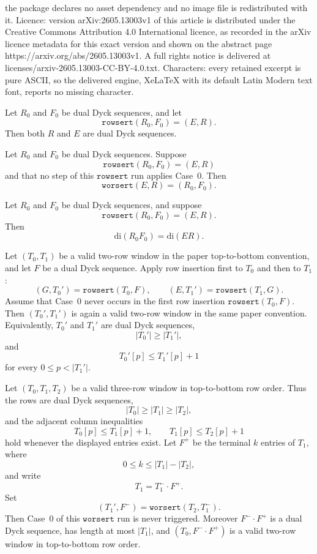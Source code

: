 \documentclass[10pt,a4paper]{amsart}
\newcommand{\di}{\mathrm{di}}
\newcommand{\rowsert}{\texttt{rowsert}}
\newcommand{\worsert}{\texttt{worsert}}
\begin{document}
the package declares no asset dependency and no image file is redistributed with it. Licence: version arXiv:2605.13003v1 of this article is distributed under the Creative Commons Attribution 4.0 International licence, as recorded in the arXiv licence metadata for this exact version and shown on the abstract page https://arxiv.org/abs/2605.13003v1. A full rights notice is delivered at licenses/arxiv-2605.13003-CC-BY-4.0.txt. Characters: every retained excerpt is pure ASCII, so the delivered engine, XeLaTeX with its default Latin Modern text font, reports no missing character.
\begin{lemma}
\label{lem:rowsert-dual-dyck}
Let \(R_0\) and \(F_0\) be dual Dyck sequences, and let
\[
  \rowsert(R_0,F_0)=(E,R).
\]
Then both \(R\) and \(E\) are dual Dyck sequences.
\end{lemma}

\begin{theorem}
\label{thm:rowsert-global-reversibility}
Let \(R_0\) and \(F_0\) be dual Dyck sequences.  Suppose
\[
  \rowsert(R_0,F_0)=(E,R)
\]
and that no step of this \(\rowsert\) run applies Case~0.  Then
\[
  \worsert(E,R)=(R_0,F_0).
\]
\end{theorem}

\begin{lemma}[\(\di\)-preservation for row insertion]
\label{lem:rowsert-di-preservation}
Let \(R_0\) and \(F_0\) be dual Dyck sequences, and suppose
\[
  \rowsert(R_0,F_0)=(E,R).
\]
Then
\[
  \di(R_0F_0)=\di(ER).
\]
\end{lemma}

\begin{lemma}
\label{lem:two-row-tableau-insertion}
Let \((T_0,T_1)\) be a valid two-row window in the paper top-to-bottom
convention, and let \(F\) be a dual Dyck sequence.  Apply row insertion first to
\(T_0\) and then to \(T_1\):
\[
  (G,T_0')=\rowsert(T_0,F),
  \qquad
  (E,T_1')=\rowsert(T_1,G).
\]
Assume that Case~0 never occurs in the first row insertion \(\rowsert(T_0,F)\).
Then \((T_0',T_1')\) is again a valid two-row window in the same paper
convention.  Equivalently, \(T_0'\) and \(T_1'\) are dual Dyck sequences,
\[
  |T_0'|\ge |T_1'|,
\]
and
\[
  T_0'[p]\le T_1'[p]+1
\]
for every \(0\le p<|T_1'|\).
\end{lemma}

\begin{lemma}
\label{lem:reverse-truncated-row-worsert}
Let \((T_0,T_1,T_2)\) be a valid three-row window in top-to-bottom row order.
Thus the rows are dual Dyck sequences,
\[
  |T_0|\ge |T_1|\ge |T_2|,
\]
and the adjacent column inequalities
\[
  T_0[p]\le T_1[p]+1,
  \qquad
  T_1[p]\le T_2[p]+1
\]
hold whenever the displayed entries exist.  Let \(F^+\) be the terminal \(k\)
entries of \(T_1\), where
\[
  0\le k\le |T_1|-|T_2|,
\]
and write
\[
  T_1=T_1^-\cdot F^+.
\]
Set
\[
  (T_1',F^-)=\worsert(T_2,T_1^-).
\]
Then Case~0 of this \(\worsert\) run is never triggered.  Moreover
\(F^-\cdot F^+\) is a dual Dyck sequence, has length at most \(|T_1|\), and
\((T_0,F^-\cdot F^+)\) is a valid two-row window in top-to-bottom row order.
\end{lemma}
\end{document}
